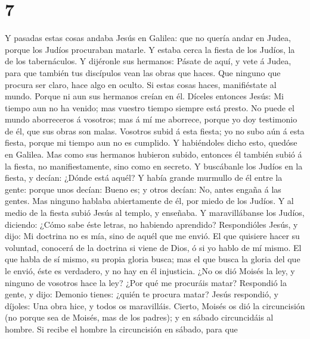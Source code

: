\hypertarget{section-6}{%
\section{7}\label{section-6}}

 Y pasadas estas cosas andaba Jesús en Galilea: que no
quería andar en Judea, porque los Judíos procuraban matarle.
 Y estaba cerca la fiesta de los Judíos, la de los
tabernáculos.  Y dijéronle sus hermanos: Pásate de aquí, y
vete á Judea, para que también tus discípulos vean las obras que haces.
 Que ninguno que procura ser claro, hace algo en oculto.
Si estas cosas haces, manifiéstate al mundo.  Porque ni
aun sus hermanos creían en él.  Díceles entonces Jesús: Mi
tiempo aun no ha venido; mas vuestro tiempo siempre está presto.
 No puede el mundo aborreceros á vosotros; mas á mí me
aborrece, porque yo doy testimonio de él, que sus obras son malas.
 Vosotros subid á esta fiesta; yo no subo aún á esta
fiesta, porque mi tiempo aun no es cumplido.  Y
habiéndoles dicho esto, quedóse en Galilea.  Mas como sus
hermanos hubieron subido, entonces él también subió á la fiesta, no
manifiestamente, sino como en secreto.  Y buscábanle los
Judíos en la fiesta, y decían: ¿Dónde está aquél?  Y
había grande murmullo de él entre la gente: porque unos decían: Bueno
es; y otros decían: No, antes engaña á las gentes.  Mas
ninguno hablaba abiertamente de él, por miedo de los Judíos.
 Y al medio de la fiesta subió Jesús al templo, y
enseñaba.  Y maravillábanse los Judíos, diciendo: ¿Cómo
sabe éste letras, no habiendo aprendido?  Respondióles
Jesús, y dijo: Mi doctrina no es mía, sino de aquél que me envió.
 El que quisiere hacer su voluntad, conocerá de la
doctrina si viene de Dios, ó si yo hablo de mí mismo.  El
que habla de sí mismo, su propia gloria busca; mas el que busca la
gloria del que le envió, éste es verdadero, y no hay en él injusticia.
 ¿No os dió Moisés la ley, y ninguno de vosotros hace la
ley? ¿Por qué me procuráis matar?  Respondió la gente, y
dijo: Demonio tienes: ¿quién te procura matar?  Jesús
respondió, y díjoles: Una obra hice, y todos os maravilláis.
 Cierto, Moisés os dió la circuncisión (no porque sea de
Moisés, mas de los padres); y en sábado circuncidáis al hombre.
 Si recibe el hombre la circuncisión en sábado, para que
